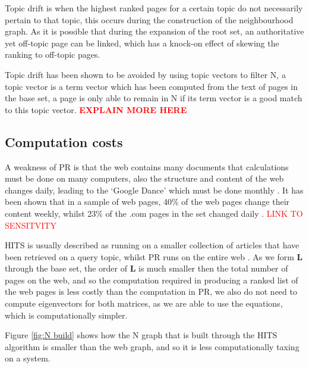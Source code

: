 \documentclass[11pt]{report}
\begin{document}
{Topic drift is when the highest ranked pages for a certain topic do not necessarily pertain to that topic, this occurs during the construction of the neighbourhood graph. As it is possible that during the expansion of the root set, an authoritative yet off-topic page can be linked, which has a knock-on effect of skewing the ranking to off-topic pages. 

Topic drift has been shown to be avoided by using topic vectors to filter N, a topic vector is a term vector which has been computed from the text of pages in the base set, a page is only able to remain in N if its term vector is a good match to this topic vector. \textcolor{red}{\textbf{EXPLAIN MORE HERE}}

\subsection{Computation costs}
A weakness of PR is that the web contains many documents that calculations must be done on many computers, also the structure and content of the web changes daily, leading to the `Google Dance' which must be done monthly \cite{thorson2004modeling}. It has been shown that in a sample of web pages, 40\% of the web pages change their content weekly, whilst 23\% of the .com pages in the set changed daily \cite{cho1999evolution}. \textcolor{red}{LINK TO SENSITVITY}

HITS is usually described as running on a smaller collection of articles that have been retrieved on a query topic, whilst PR runs on the entire web \cite{ng2001link}. As we form \textbf{L} through the base set, the order of \textbf{L} is much smaller then the total number of pages on the web, and so the computation required in producing a ranked list of the web pages is less costly than the computation in PR, we also do not need to compute eigenvectors for both matrices, as we are able to use the equations, which is computationally simpler. 

Figure \ref{fig:N build} shows how the N graph that is built through the HITS algorithm is smaller than the web graph, and so it is less computationally taxing on a system.

}
\end{document}
